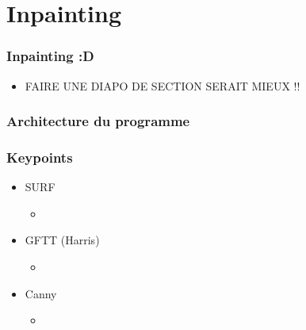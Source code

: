  \section{Inpainting}
\begin{frame}
  \frametitle{Inpainting :D}
  \begin{itemize}
  \item FAIRE UNE DIAPO DE SECTION SERAIT MIEUX !!
  \end{itemize}

\end{frame}



\begin{frame}
  \frametitle{Architecture du programme}


\end{frame}



\begin{frame}
  \frametitle{Keypoints}
  
  \begin{itemize}
  \item SURF
  	\begin{itemize}
  	\item
  	\end{itemize}
  	
  \item GFTT (Harris)
	\begin{itemize}
  	\item
  	\end{itemize}
  	
  \item Canny
    \begin{itemize}
  	\item
  	\end{itemize}
  	
  \end{itemize}

\end{frame}



